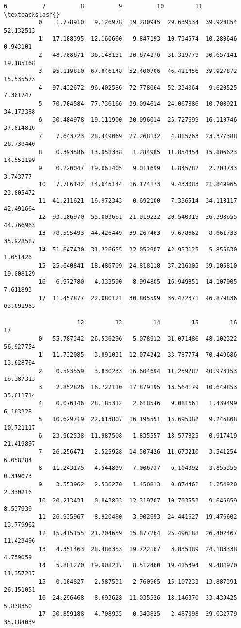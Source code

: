 \documentclass[11pt]{article}
\begin{document}
\begin{Verbatim}[commandchars=\\\{\}]
                     6          7          8          9          10         11  \textbackslash{}
          0    1.778910   9.126978  19.280945  29.639634  39.920854  52.132513   
          1   17.108395  12.160660   9.847193  10.734574  10.280646   0.943101   
          2   48.708671  36.148151  30.674376  31.319779  30.657141  19.185168   
          3   95.119810  67.846148  52.400706  46.421456  39.927872  15.535573   
          4   97.432672  96.402586  72.778064  52.334064   9.620525   7.361747   
          5   70.704584  77.736166  39.094614  24.067886  10.708921  34.173388   
          6   30.484978  19.111900  30.096014  25.727699  16.110746  37.814816   
          7    7.643723  28.449069  27.268132   4.885763  23.377388  28.738440   
          8    0.393586  13.958338   1.284985  11.854454  15.806623  14.551199   
          9    0.220047  19.061405   9.011699   1.845782   2.208733   3.743777   
          10   7.786142  14.645144  16.174173   9.433083  21.849965  23.805472   
          11  41.211621  16.972343   0.692100   7.336514  34.118117  42.491664   
          12  93.186970  55.003661  21.019222  20.540319  26.398655  44.766963   
          13  78.595493  44.426449  39.267463   9.678662   8.661733  35.928587   
          14  51.647430  31.226655  32.052907  42.953125   5.855630   1.051426   
          15  25.640841  18.486709  24.818118  37.216305  39.105810  19.008129   
          16   6.972780   4.333590   8.994805  16.949851  14.107905   7.611893   
          17  11.457877  22.080121  30.805599  36.472371  46.879836  63.691983   
          
                     12         13         14         15         16         17  
          0   55.787342  26.536296   5.078912  31.071486  48.102322  56.927754  
          1   11.732085   3.891031  12.074342  33.787774  70.449686  13.628764  
          2    0.593559   3.830233  16.604694  11.259282  40.973153  16.387313  
          3    2.852826  16.722110  17.879195  13.564179  10.649853  35.611714  
          4    0.076146  28.185312   2.618546   9.081661   1.439499   6.163328  
          5   10.629719  22.613807  16.195551  15.695082   9.246808  10.721117  
          6   23.962538  11.987508   1.835557  18.577825   0.917419  21.419897  
          7   26.256471   2.525928  14.507426  11.673210   3.541254   6.058284  
          8   11.243175   4.544899   7.006737   6.104392   3.855355   0.319073  
          9    3.553962   2.536270   1.450813   0.874462   1.254920   2.330216  
          10  20.213431   0.843803  12.319707  10.703553   9.646659   8.537939  
          11  26.935967   8.920480   3.902693  24.441627  19.476602  13.779962  
          12  15.415155  21.204659  15.877264  25.496188  26.402467  11.423496  
          13   4.351463  28.486353  19.722167   3.835889  24.183338   4.759059  
          14   5.881270  19.908217   8.512460  19.415394   9.484970  11.357217  
          15   0.104827   2.587531   2.760965  15.107233  13.887391  26.151051  
          16  24.296468   8.693628  11.035526  18.146370  33.439425   5.838350  
          17  30.859188   4.708935   0.343825   2.487098  29.032779  35.884039  
\end{Verbatim}
            
\end{document}
